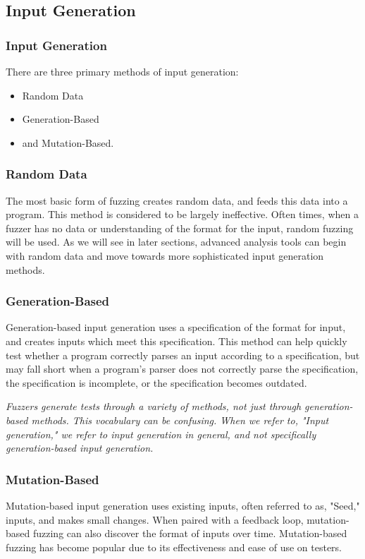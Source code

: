 \documentclass{beamer}
\begin{document}
\subsection{Input Generation}
\begin{frame}
\frametitle{Input Generation}
There are three primary methods of input generation:

\begin{itemize}
  \item Random Data
  \item Generation-Based
  \item and Mutation-Based.
\end{itemize}
\end{frame}

\begin{frame}
\frametitle{Random Data}
The most basic form of fuzzing creates random data, and feeds this data into a program. This method is considered to be largely ineffective. Often times, when a fuzzer has no data or understanding of the format for the input, random fuzzing will be used. As we will see in later sections, advanced analysis tools can begin with random data and move towards more sophisticated input generation methods.
\end{frame}

\begin{frame}
\frametitle{Generation-Based}
Generation-based input generation uses a specification of the format for input, and creates inputs which meet this specification. This method can help quickly test whether a program correctly parses an input according to a specification, but may fall short when a program's parser does not correctly parse the specification, the specification is incomplete, or the specification becomes outdated.
\par
\textit{Fuzzers generate tests through a variety of methods, not just through generation-based methods. This vocabulary can be confusing. When we refer to, "Input generation," we refer to input generation in general, and not specifically generation-based input generation.}
\end{frame}

\begin{frame}[fragile]
\frametitle{Mutation-Based}
Mutation-based input generation uses existing inputs, often referred to as, "Seed," inputs, and makes small changes. When paired with a feedback loop, mutation-based fuzzing can also discover the format of inputs over time. Mutation-based fuzzing has become popular due to its effectiveness and ease of use on testers.
\end{frame}
\end{document}
